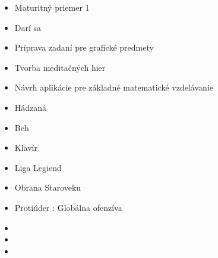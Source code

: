 
\begin{itemize}
    \item Maturitný priemer 1
\end{itemize}

\divider

\begin{itemize}
    \item Darí sa
\end{itemize}

\begin{itemize}
\item Príprava zadaní pre grafické predmety
\end{itemize}
\smallskip
{}
\begin{itemize}
\item Tvorba meditačných hier
\end{itemize}
\smallskip
{}
\begin{itemize}
\item Návrh aplikácie pre základné matematické vzdelávanie
\end{itemize}
\smallskip

\begin{itemize}
\item Hádzaná
\item Beh
\end{itemize}
\smallskip
{}
\begin{itemize}
\item Klavír
\end{itemize}
\smallskip
{}
\begin{itemize}
\item Liga Legiend
\item Obrana Staroveku
\item Protiúder : Globálna ofenzíva
\end{itemize}
\smallskip

\begin{itemize}
    \item{}
    \item{}
    \item{}
\end{itemize}
\smallskip
